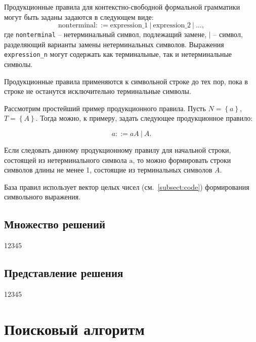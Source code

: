 Продукционные правила для контекстно-свободной формальной грамматики могут быть заданы задаются в следующем виде:
\begin{equation}
    \mathrm{nonterminal} ::= \mathrm{expression\_1}\ \vert\ \mathrm{expression\_2}\ \vert\ \dots,
    \label{ge:eq:prod_rule}
\end{equation}
где \texttt{nonterminal} -- нетерминальный символ, подлежащий замене, $\vert$ -- символ, разделяющий варианты замены нетерминальных символов.
Выражения \texttt{expression\_n} могут содержать как терминальные, так и нетерминальные символы.

Продукционные правила применяются к символьной строке до тех пор, пока в строке не останутся исключительно терминальные символы.

\begin{example}
    Рассмотрим простейший пример продукционного правила.
    Пусть $N = \left\{a \right\}$, $T = \left\{ A \right\} $.
    Тогда можно, к примеру, задать следующее продукционное правило:

    \begin{equation*}
        a ::= aA\ \vert\ A.
    \end{equation*}

    Если следовать данному продукционному правилу для начальной строки, состоящей из нетерминального символа $\mathrm{a}$, то можно формировать строки символов длины не менее 1, состоящие из терминальных символов $A$.
\end{example}

База правил использует вектор целых чисел (см.~\ref{subsect:code}) формирования символьного выражения.

\subsection{Множество решений} \label{subsect:population}

12345

\subsection{Представление решения} \label{subsect:representation}

12345

\section{Поисковый алгоритм} \label{sect:engine}

